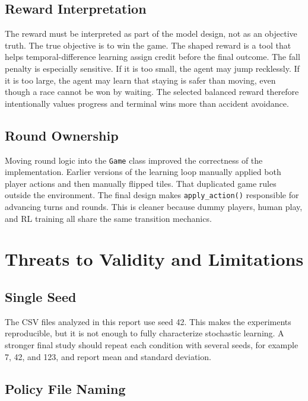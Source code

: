 \documentclass[conference]{IEEEtran}
\begin{document}
\subsection{Reward Interpretation}

The reward must be interpreted as part of the model design, not as an objective
truth. The true objective is to win the game. The shaped reward is a tool that
helps temporal-difference learning assign credit before the final outcome. The
fall penalty is especially sensitive. If it is too small, the agent may jump
recklessly. If it is too large, the agent may learn that staying is safer than
moving, even though a race cannot be won by waiting. The selected balanced reward
therefore intentionally values progress and terminal wins more than accident
avoidance.

\subsection{Round Ownership}

Moving round logic into the \texttt{Game} class improved the correctness of the
implementation. Earlier versions of the learning loop manually applied both player
actions and then manually flipped tiles. That duplicated game rules outside the
environment. The final design makes \texttt{apply\_action()} responsible for
advancing turns and rounds. This is cleaner because dummy players, human play, and
RL training all share the same transition mechanics.

\section{Threats to Validity and Limitations}

\subsection{Single Seed}

The CSV files analyzed in this report use seed 42. This makes the experiments
reproducible, but it is not enough to fully characterize stochastic learning. A
stronger final study should repeat each condition with several seeds, for example
7, 42, and 123, and report mean and standard deviation.

\subsection{Policy File Naming}
\end{document}

